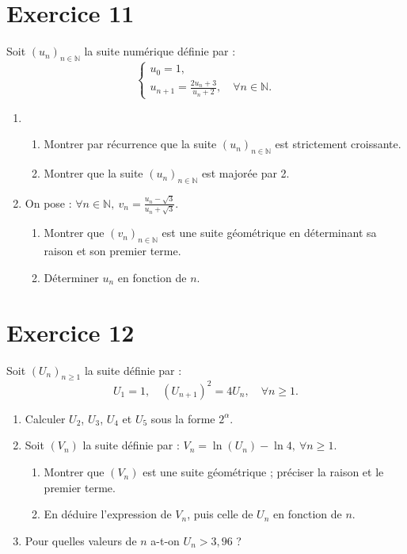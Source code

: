 \documentclass[a4paper,11pt]{article}
\begin{document}
\section*{Exercice 11}

Soit \((u_n)_{n \in \mathbb{N}}\) la suite numérique définie par :
\[
\begin{cases}
u_0 = 1, \\
u_{n+1} = \frac{2u_n + 3}{u_n + 2}, \quad \forall n \in \mathbb{N}.
\end{cases}
\]

\begin{enumerate}
    \item 
    \begin{enumerate}
        \item Montrer par récurrence que la suite \((u_n)_{n \in \mathbb{N}}\) est strictement croissante.
        \item Montrer que la suite \((u_n)_{n \in \mathbb{N}}\) est majorée par 2.
    \end{enumerate}

    \item On pose : \(\forall n \in \mathbb{N}, \ v_n = \frac{u_n - \sqrt{3}}{u_n + \sqrt{3}}\).
    \begin{enumerate}
        \item Montrer que \((v_n)_{n \in \mathbb{N}}\) est une suite géométrique en déterminant sa raison et son premier terme.
        \item Déterminer \(u_n\) en fonction de \(n\).
    \end{enumerate}
\end{enumerate}

\section*{Exercice 12}

Soit \((U_n)_{n \geq 1}\) la suite définie par :
\[
U_1 = 1, \quad (U_{n+1})^2 = 4U_n, \quad \forall n \geq 1.
\]

\begin{enumerate}
    \item Calculer \(U_2\), \(U_3\), \(U_4\) et \(U_5\) sous la forme \(2^\alpha\).
    \item Soit \((V_n)\) la suite définie par : \(V_n = \ln(U_n) - \ln 4, \ \forall n \geq 1\).
    \begin{enumerate}
        \item Montrer que \((V_n)\) est une suite géométrique ; préciser la raison et le premier terme.
        \item En déduire l'expression de \(V_n\), puis celle de \(U_n\) en fonction de \(n\).
    \end{enumerate}
    \item Pour quelles valeurs de \(n\) a-t-on \(U_n > 3,96\) ?
\end{enumerate}
\end{document}
